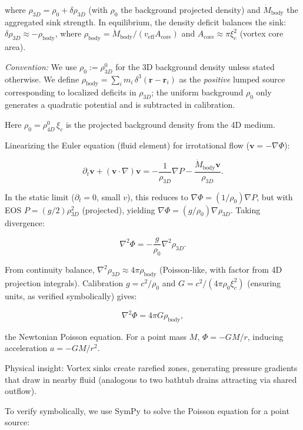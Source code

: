 where $\rho_{3D} = \rho_0 + \delta \rho_{3D}$ (with $\rho_0$ the background projected density) and $\dot{M}_{\text{body}}$ the aggregated sink strength. In equilibrium, the density deficit balances the sink: $\delta \rho_{3D} \approx -\rho_{\text{body}}$, where $\rho_{\text{body}} = \dot{M}_{\text{body}} / (v_{\text{eff}} A_{\text{core}})$ and $A_{\text{core}} \approx \pi \xi_c^2$ (vortex core area).

\noindent\textit{Convention:} We use $\rho_0 := \rho_{3D}^0$ for the 3D background density unless stated otherwise.
We define $\rho_{\text{body}} = \sum_i m_i \, \delta^3(\mathbf r - \mathbf r_i)$ as the \emph{positive} lumped source corresponding to localized deficits in $\rho_{3D}$; the uniform background $\rho_0$ only generates a quadratic potential and is subtracted in calibration.

Here $\rho_0 = \rho_{4D}^0 \, \xi_c$ is the projected background density from the 4D medium.

Linearizing the Euler equation (fluid element) for irrotational flow ($\mathbf{v} = -\nabla \Phi$):

\[
\partial_t \mathbf{v} + (\mathbf{v} \cdot \nabla) \mathbf{v} = -\frac{1}{\rho_{3D}} \nabla P - \frac{\dot{M}_{\text{body}} \mathbf{v}}{\rho_{3D}}.
\]

In the static limit ($\partial_t = 0$, small $v$), this reduces to $\nabla \Phi = (1 / \rho_0) \nabla P$, but with EOS $P = (g / 2) \rho_{3D}^2$ (projected), yielding $\nabla \Phi = (g / \rho_0) \nabla \rho_{3D}$. Taking divergence:

\[
\nabla^2 \Phi = -\frac{g}{\rho_0} \nabla^2 \rho_{3D}.
\]

From continuity balance, $\nabla^2 \rho_{3D} \approx 4\pi \rho_{\text{body}}$ (Poisson-like, with factor from 4D projection integrals). Calibration $g = c^2 / \rho_0$ and $G = c^2 / (4\pi \rho_0 \xi_c^2)$ (ensuring units, as verified symbolically) gives:

\[
\nabla^2 \Phi = 4\pi G \rho_{\text{body}},
\]

the Newtonian Poisson equation. For a point mass $M$, $\Phi = -G M / r$, inducing acceleration $a = -G M / r^2$.

Physical insight: Vortex sinks create rarefied zones, generating pressure gradients that draw in nearby fluid (analogous to two bathtub drains attracting via shared outflow).

To verify symbolically, we use SymPy to solve the Poisson equation for a point source:

